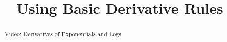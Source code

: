 \documentclass[handout]{ximera}
\title{Using Basic Derivative Rules}
\begin{document}
\begin{abstract} Video: Derivatives of Exponentials and Logs %
\end{abstract}

\maketitle

\end{document}
